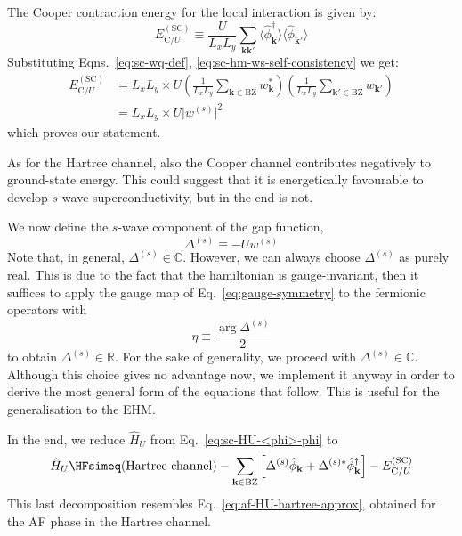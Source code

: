 \begin{tabproof}
	The Cooper contraction energy for the local interaction is given by:
	\[
		E_{\mathrm{C}/U}^{(\mathrm{SC})} \equiv \frac{U}{L_x L_y} \sum_{\mathbf{k}\mathbf{k}'} \big\langle
		\hat \phi_\mathbf{k}^\dagger
		\big\rangle \big\langle
		\hat \phi_{\mathbf{k}'}
		\big\rangle
	\]
	Substituting Eqns.~\eqref{eq:sc-wq-def}, \eqref{eq:sc-hm-ws-self-consistency} we get:
	\begin{align}
		E_{\mathrm{C}/U}^{(\mathrm{SC})} &= L_x L_y \times U \left(\frac{1}{L_x L_y} \sum_{\mathbf{k}\in\mathrm{BZ}} w_\mathbf{k}^*\right) \left(\frac{1}{L_x L_y} \sum_{\mathbf{k}'\in\mathrm{BZ}} w_{\mathbf{k}'}\right) \\
		&= L_x L_y \times U \big| w^{(s)} \big|^2 \label{eq:sc-cooper-U-contraction-energy}
	\end{align}
	which proves our statement.
\end{tabproof}
%
As for the Hartree channel, also the Cooper channel contributes negatively to ground-state energy. This could suggest that it is energetically favourable to develop $s$-wave superconductivity, but in the end is not.

We now define the $s$-wave component of the gap function,
\begin{equation}\label{eq:sc-Delta^s}
	\Delta^{(s)} \equiv -U w^{(s)}
\end{equation}
Note that, in general, $\Delta^{(s)} \in \mathbb{C}$. However, we can always choose $\Delta^{(s)}$ as purely real. This is due to the fact that the hamiltonian is gauge-invariant, then it suffices to apply the gauge map of Eq.~\eqref{eq:gauge-symmetry} to the fermionic operators with
\[
	\eta \equiv \frac{\arg \Delta^{(s)}}{2}
\]
to obtain $\Delta^{(s)} \in \mathbb{R}$. For the sake of generality, we proceed with $\Delta^{(s)} \in \mathbb{C}$. Although this choice gives no advantage now, we implement it anyway in order to derive the most general form of the equations that follow. This is useful for the generalisation to the EHM.

In the end, we reduce $\hat H_U$ from Eq.~\eqref{eq:sc-HU-<phi>-phi} to
\begin{equation}\label{eq:sc-HU-gap-phi}
	\hat H_U \HFsimeq \text{(Hartree channel)} - \sum_{\mathbf{k}\in\mathrm{BZ}} \left[
	\Delta^{(s)} \hat \phi_\mathbf{k} + 
	\Delta^{(s)*} \hat \phi_\mathbf{k}^\dagger
	\right] - E_{\mathrm{C}/U}^{(\mathrm{SC})}
\end{equation}
This last decomposition resembles Eq.~\eqref{eq:af-HU-hartree-approx}, obtained for the AF phase in the Hartree channel.

